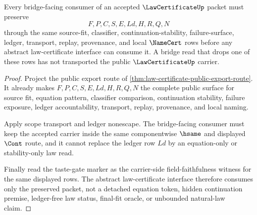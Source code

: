 \begin{theorem}
\label{thm:law-certificate-bridge-carrier-route}
Every bridge-facing consumer of an accepted $\LawCertificateUp$ packet must preserve
$$
F,P,C,S,E,Ld,H,R,Q,N
$$
through the same source-fit, classifier, continuation-stability, failure-surface, ledger, transport, replay, provenance, and local $\NameCert$ rows before any abstract law-certificate interface can consume it. A bridge read that drops one of these rows has not transported the public $\LawCertificateUp$ carrier.
\end{theorem}
\begin{proof}
Project the public export route of \autoref{thm:law-certificate-public-export-route}. It already makes $F,P,C,S,E,Ld,H,R,Q,N$ the complete public surface for source fit, equation pattern, classifier comparison, continuation stability, failure exposure, ledger accountability, transport, replay, provenance, and local naming.

Apply scope transport and ledger nonescape. The bridge-facing consumer must keep the accepted carrier inside the same componentwise $\hsame$ and displayed $\Cont$ route, and it cannot replace the ledger row $Ld$ by an equation-only or stability-only law read.

Finally read the taste-gate marker as the carrier-side field-faithfulness witness for the same displayed rows. The abstract law-certificate interface therefore consumes only the preserved packet, not a detached equation token, hidden continuation premise, ledger-free law status, final-fit oracle, or unbounded natural-law claim.
\end{proof}

